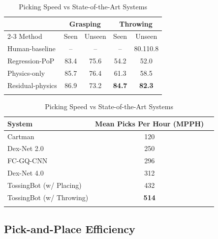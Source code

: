 \documentclass[journal]{IEEEtran}
\newcommand{\rpm}{\raisebox{.2ex}{$\scriptstyle\pm$}}
\begin{document}
\begin{table}[h]
  \centering
  \caption{Grasping and Throwing Performance in Real (Mean \%)}
  \vspace{-1em}
  \begin{tabular}{lcccc}
  \toprule
  & \multicolumn{2}{c}{Grasping} & \multicolumn{2}{c}{Throwing}\\
  \cmidrule{2-3}
  \cmidrule{4-5}
  Method & Seen & Unseen & Seen & Unseen\\
  \midrule
  Human-baseline   & --   & --   & --   & 80.1\rpm10.8 \\
  Regression-PoP   & 83.4 & 75.6 & 54.2 & 52.0 \\   
  Physics-only     & 85.7 & 76.4 & 61.3 & 58.5 \\    
  Residual-physics & 86.9 & 73.2 & \bf{84.7} & \bf{82.3} \\  
  \bottomrule
  \label{table:performance-real}
  \end{tabular}
  \centering
  \caption{Picking Speed vs State-of-the-Art Systems}
  \vspace{-1em}
  \begin{tabular}{l c c}
  \toprule
  System & Mean Picks Per Hour (MPPH) \\
  \midrule
  Cartman \cite{morrison2018cartman} & 120 \\
  Dex-Net 2.0 \cite{mahler2017dex} & 250 \\
  FC-GQ-CNN \cite{satish2018on} & 296 \\
  Dex-Net 4.0 \cite{mahler2019learning} & 312 \\
  TossingBot (w/ Placing) & 432 \\  
  TossingBot (w/ Throwing) & \bf{514} \\   
  \bottomrule
  \label{table:picking-speed}
  \end{tabular}
  \vspace{-2em}
\end{table}

\subsection{Pick-and-Place Efficiency} 
\end{document}
